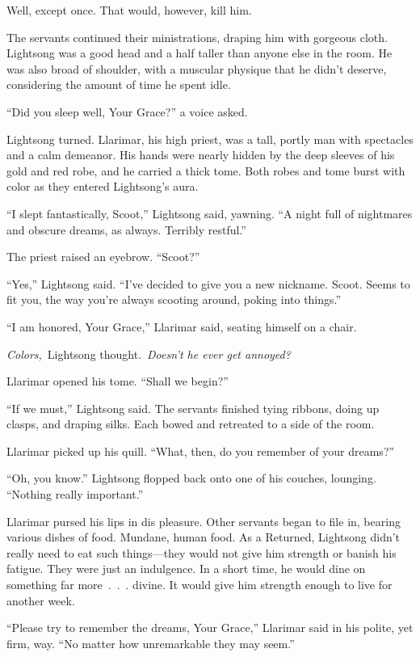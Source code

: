 Well, except once. That would, however, kill him.

The servants continued their ministrations, draping him with gorgeous cloth. Lightsong was a good head and a half taller than anyone else in the room. He was also broad of shoulder, with a muscular physique that he didn’t deserve, considering the amount of time he spent idle.

“Did you sleep well, Your Grace?” a voice asked.

Lightsong turned. Llarimar, his high priest, was a tall, portly man with spectacles and a calm demeanor. His hands were nearly hidden by the deep sleeves of his gold and red robe, and he carried a thick tome. Both robes and tome burst with color as they entered Lightsong’s aura.

“I slept fantastically, Scoot,” Lightsong said, yawning. “A night full of nightmares and obscure dreams, as always. Terribly restful.”

The priest raised an eyebrow. “Scoot?”

“Yes,” Lightsong said. “I’ve decided to give you a new nickname. Scoot. Seems to fit you, the way you’re always scooting around, poking into things.”

“I am honored, Your Grace,” Llarimar said, seating himself on a chair.

\textit{Colors,}~Lightsong thought.~\textit{Doesn’t he ever get annoyed?}

Llarimar opened his tome. “Shall we begin?”

“If we must,” Lightsong said. The servants finished tying ribbons, doing up clasps, and draping silks. Each bowed and retreated to a side of the room.

Llarimar picked up his quill. “What, then, do you remember of your dreams?”

“Oh, you know.” Lightsong flopped back onto one of his couches, lounging. “Nothing really important.”

Llarimar pursed his lips in dis pleasure. Other servants began to file in, bearing various dishes of food. Mundane, human food. As a Returned, Lightsong didn’t really need to eat such things—they would not give him strength or banish his fatigue. They were just an indulgence. In a short time, he would dine on something far more~.~.~. divine. It would give him strength enough to live for another week.

“Please try to remember the dreams, Your Grace,” Llarimar said in his polite, yet firm, way. “No matter how unremarkable they may seem.”

